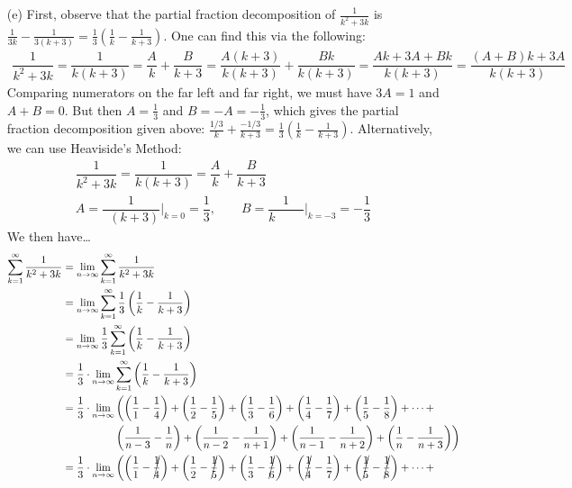 \documentclass[11pt,letterpaper]{article}
\begin{document}
\begin{enumerate}
\item[(e)] First, observe that the partial fraction decomposition of $\frac{1}{k^2 + 3k}$ is $\frac{1}{3k} - \frac{1}{3(k + 3)}= \frac{1}{3} \left(\frac{1}{k} - \frac{1}{k + 3} \right)$. One can find this via the following:
	\[
	\begin{aligned}
	\dfrac{1}{k^2 + 3k}= \dfrac{1}{k(k + 3)}= \dfrac{A}{k} + \dfrac{B}{k + 3}= \dfrac{A(k + 3)}{k(k + 3)} + \dfrac{Bk}{k(k + 3)}= \dfrac{Ak + 3A + Bk}{k(k + 3)}= \dfrac{(A + B)k + 3A}{k(k + 3)}
	\end{aligned}
	\]
Comparing numerators on the far left and far right, we must have $3A= 1$ and $A + B= 0$. But then $A= \frac{1}{3}$ and $B= -A= -\frac{1}{3}$, which gives the partial fraction decomposition given above: $\frac{1/3}{k} + \frac{-1/3}{k + 3}= \frac{1}{3} \left( \frac{1}{k} - \frac{1}{k + 3} \right)$. Alternatively, we can use Heaviside's Method: 
	\[
	\begin{gathered}
	\dfrac{1}{k^2 + 3k}= \dfrac{1}{k(k + 3)}= \dfrac{A}{k} + \dfrac{B}{k + 3} \\
	A= \dfrac{1}{\boxed{\phantom{k}} (k + 3)} \bigg|_{k=0}= \dfrac{1}{3}, \qquad B= \dfrac{1}{k \boxed{\phantom{k + 3}}} \bigg|_{k= -3}= -\dfrac{1}{3}
	\end{gathered}
	\]
We then have\dots
	\[
	\begin{aligned}
	\sum_{k=1}^\infty \dfrac{1}{k^2 + 3k}&= \lim_{n \to \infty} \sum_{k=1}^\infty \dfrac{1}{k^2 + 3k} \\
	&= \lim_{n \to \infty} \sum_{k=1}^\infty \dfrac{1}{3} \left(\frac{1}{k} - \frac{1}{k + 3} \right) \\
	&= \lim_{n \to \infty} \dfrac{1}{3} \sum_{k=1}^\infty \left(\frac{1}{k} - \frac{1}{k + 3} \right) \\
	&= \dfrac{1}{3} \cdot \lim_{n \to \infty} \sum_{k=1}^\infty \left(\frac{1}{k} - \frac{1}{k + 3} \right) \\
	&= \dfrac{1}{3} \cdot \lim_{n \to \infty} \left( \left( \dfrac{1}{1} - \dfrac{1}{4} \right) + \left( \dfrac{1}{2} - \dfrac{1}{5} \right) + \left( \dfrac{1}{3} - \dfrac{1}{6} \right) + \left( \dfrac{1}{4} - \dfrac{1}{7} \right) + \left( \dfrac{1}{5} - \dfrac{1}{8} \right) + \cdots + \right. \\
	& \phantom{-----} \left. \left( \dfrac{1}{n - 3} - \dfrac{1}{n} \right) + \left( \dfrac{1}{n - 2} - \dfrac{1}{n + 1} \right) + \left( \dfrac{1}{n - 1} - \dfrac{1}{n + 2} \right) + \left( \dfrac{1}{n} - \dfrac{1}{n + 3} \right) \right) \\
	&= \dfrac{1}{3} \cdot \lim_{n \to \infty} \left( \left( \dfrac{1}{1} - \cancel{\dfrac{1}{4}} \right) + \left( \dfrac{1}{2} - \cancel{\dfrac{1}{5}} \right) + \left( \dfrac{1}{3} - \cancel{\dfrac{1}{6}} \right) + \left( \cancel{\dfrac{1}{4}} - \dfrac{1}{7} \right) + \left( \cancel{\dfrac{1}{5}} - \cancel{\dfrac{1}{8}} \right) + \cdots + \right. \\

\end{aligned}\]
\end{enumerate}
\end{document}
